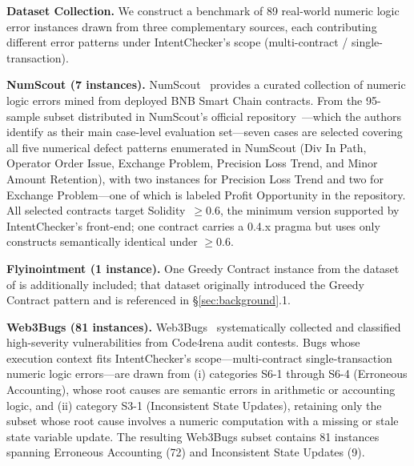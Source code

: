 \documentclass[pdflatex,sn-basic]{sn-jnl}%
\theoremstyle{thmstyleone}%
\theoremstyle{thmstyletwo}%
\theoremstyle{thmstylethree}%
\begin{document}
\smallskip
\noindent\textbf{Dataset Collection.}
We construct a benchmark of 89 real-world numeric logic error instances drawn from three complementary sources, each contributing different error patterns under IntentChecker's scope (multi-contract / single-transaction).

\smallskip\noindent\textbf{NumScout (7 instances).}
NumScout~\citep{numscout} provides a curated collection of numeric logic errors mined from deployed BNB Smart Chain contracts.
From the 95-sample subset distributed in NumScout's official repository~\citep{numscout_dataset}---which the authors identify as their main case-level evaluation set---seven cases are selected covering all five numerical defect patterns enumerated in NumScout (Div In Path, Operator Order Issue, Exchange Problem, Precision Loss Trend, and Minor Amount Retention), with two instances for Precision Loss Trend and two for Exchange Problem---one of which is labeled Profit Opportunity in the repository.
All selected contracts target Solidity~$\geq$0.6, the minimum version supported by IntentChecker's front-end; one contract carries a 0.4.x pragma but uses only constructs semantically identical under $\geq$0.6.

\smallskip\noindent\textbf{Flyinointment (1 instance).}
One Greedy Contract instance from the dataset of \citet{flyinointment} is additionally included; that dataset originally introduced the Greedy Contract pattern and is referenced in §\ref{sec:background}.1.

\smallskip\noindent\textbf{Web3Bugs (81 instances).}
Web3Bugs~\citep{exploitablebugs} systematically collected and classified high-severity vulnerabilities from Code4rena audit contests.
Bugs whose execution context fits IntentChecker's scope---multi-contract single-transaction numeric logic errors---are drawn from (i) categories S6-1 through S6-4 (Erroneous Accounting), whose root causes are semantic errors in arithmetic or accounting logic, and (ii) category S3-1 (Inconsistent State Updates), retaining only the subset whose root cause involves a numeric computation with a missing or stale state variable update.
The resulting Web3Bugs subset contains 81 instances spanning Erroneous Accounting (72) and Inconsistent State Updates (9).
\end{document}
